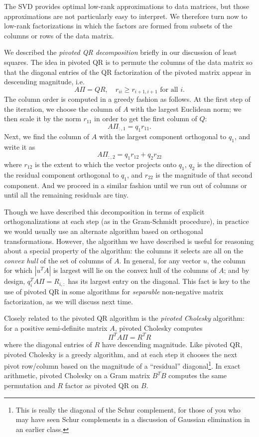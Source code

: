 \documentclass[12pt, leqno]{article} %
\begin{document}
The SVD provides optimal low-rank approximations to data matrices, but
those approximations are not particularly easy to interpret.  We
therefore turn now to low-rank factorizations in which the factors are
formed from subsets of the columns or rows of the data matrix.

We described the {\em pivoted QR decomposition} briefly in our discussion
of least squares.  The idea in pivoted QR is to permute the columns of
the data matrix so that the diagonal entries of the QR factorization
of the pivoted matrix appear in descending magnitude, i.e.
\[
  A \Pi = Q R, \quad r_{ii} \geq r_{i+1,i+1} \mbox{ for all } i.
\]
The column order is computed in a greedy fashion as follows.  At the
first step of the iteration, we choose the column of $A$ with the
largest Euclidean norm; we then scale it by the norm $r_{11}$ in order
to get the first column of $Q$:
\[
  A \Pi_{:,1} = q_1 r_{11}.
\]
Next, we find the column of $A$ with the largest component orthogonal
to $q_1$, and write it as
\[
  A \Pi_{:,2} = q_1 r_{12} + q_2 r_{22}
\]
where $r_{12}$ is the extent to which the vector projects onto $q_1$,
$q_2$ is the direction of the residual component orthogonal to $q_1$,
and $r_{22}$ is the magnitude of that second component.  And we
proceed in a similar fashion until we run out of columns or until
all the remaining residuals are tiny.

Though we have described this decomposition in terms of explicit
orthogonalizations at each step (as in the Gram-Schmidt procedure), in
practice we would usually use an alternate algorithm based on
orthogonal transformations.  However, the algorithm we have described
is useful for reasoning about a special property of the algorithm: the
columns it selects are all on the {\em convex hull} of the set of
columns of $A$.  In general, for any vector $u$, the column for which
$|u^T A|$ is largest will lie on the convex hull of the columns of
$A$; and by design, $q_i^T A \Pi = R_{i,:}$ has its largest entry on
the diagonal.  This fact is key to the use of pivoted QR in some
algorithms for {\em separable} non-negative matrix factorization, as
we will discuss next time.

Closely related to the pivoted QR algorithm is the {\em pivoted
  Cholesky} algorithm: for a positive semi-definite matrix $A$,
pivoted Cholesky computes
\[
  \Pi^T A \Pi = R^T R
\]
where the diagonal entries of $R$ have descending magnitude.  Like
pivoted QR, pivoted Cholesky is a greedy algorithm, and at each step
it chooses the next pivot row/column based on the magnitude of a
``residual'' diagonal\footnote{This is really the diagonal of the
  Schur complement, for those of you who may have seen Schur
  complements in a discussion of Gaussian elimination in an earlier
  class.}.
In exact arithmetic, pivoted Cholesky on a Gram matrix $B^T B$
computes the same permutation and $R$ factor as pivoted QR on $B$.
\end{document}
